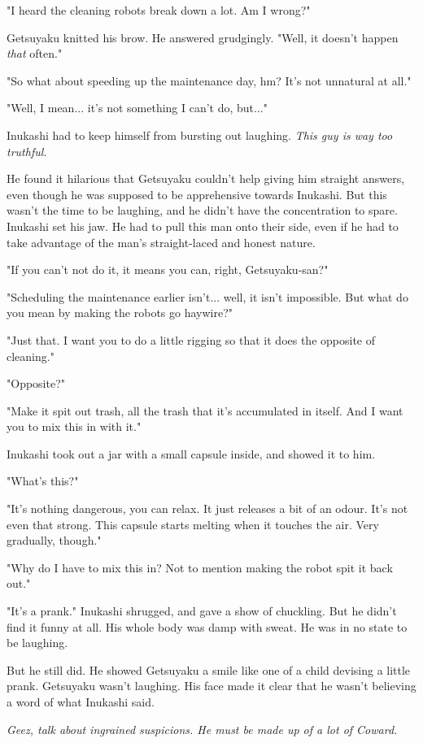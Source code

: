 "I heard the cleaning robots break down a lot. Am I wrong?"

Getsuyaku knitted his brow. He answered grudgingly. "Well, it doesn't
happen \emph{that} often."

"So what about speeding up the maintenance day, hm? It's not unnatural
at all."

"Well, I mean... it's not something I can't do, but..."

Inukashi had to keep himself from bursting out laughing. \emph{This guy is way
	too truthful.}

He found it hilarious that Getsuyaku couldn't help giving him straight
answers, even though he was supposed to be apprehensive towards
Inukashi. But this wasn't the time to be laughing, and he didn't have
the concentration to spare. Inukashi set his jaw. He had to pull this
man onto their side, even if he had to take advantage of the man's
straight-laced and honest nature.

"If you can't not do it, it means you can, right, Getsuyaku-san?"

"Scheduling the maintenance earlier isn't... well, it isn't impossible.
But what do you mean by making the robots go haywire?"

"Just that. I want you to do a little rigging so that it does the
opposite of cleaning."

"Opposite?"

"Make it spit out trash, all the trash that it's accumulated in itself.
And I want you to mix this in with it."

Inukashi took out a jar with a small capsule inside, and showed it to
him.

"What's this?"

"It's nothing dangerous, you can relax. It just releases a bit of an
odour. It's not even that strong. This capsule starts melting when it
touches the air. Very gradually, though."

"Why do I have to mix this in? Not to mention making the robot spit it
back out."

"It's a prank." Inukashi shrugged, and gave a show of chuckling. But he
didn't find it funny at all. His whole body was damp with sweat. He was
in no state to be laughing.

But he still did. He showed Getsuyaku a smile like one of a child
devising a little prank. Getsuyaku wasn't laughing. His face made it
clear that he wasn't believing a word of what Inukashi said.

\emph{Geez, talk about ingrained suspicions. He must be made up of a lot of
	Coward.}

